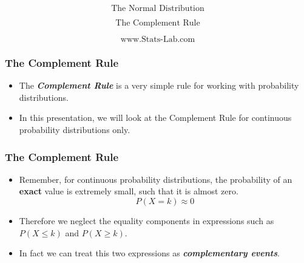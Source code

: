 \documentclass[IntroMain.tex]{subfiles}
\begin{document}
	\begin{frame}
{\Huge \[ \mbox{The Normal Distribution}\] }

{\huge \[ \mbox{The Complement Rule}\] }

\bigskip

{\Large \[ \mbox{www.Stats-Lab.com} \]}
\end{frame}
\begin{frame}
\frametitle{The Complement Rule}
\Large
\begin{itemize}
\item The \textbf{\textit{Complement Rule}} is a very simple rule for working with probability distributions.
\item In this presentation, we will look at the Complement Rule for continuous probability distributions only.

\end{itemize}
\end{frame}

\begin{frame}
\frametitle{The Complement Rule}
\Large
\begin{itemize}

\item Remember, for continuous probability distributions, the probability of an \textbf{exact} value is extremely small, such that it is almost zero.
\[P(X = k) \approx 0\]
\item Therefore we neglect the equality components in expressions such as
$P(X \leq k)$ and $P(X \geq k)$.
\item In fact we can treat this two expressions as \textbf{\textit{complementary events}}.
\end{itemize}
\end{frame}
\end{document}
